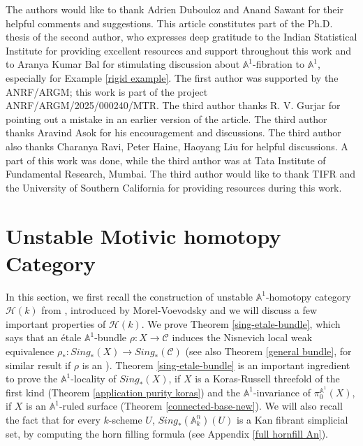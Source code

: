 \documentclass[11pt, reqno]{amsart}
\theoremstyle{plain}
\theoremstyle{definition}
\newcommand{\A}{{\mathbb A}}
\begin{document}
The authors would like to thank Adrien Dubouloz and Anand Sawant for their helpful comments and suggestions. This article constitutes part of the Ph.D. thesis of the second author, who expresses deep gratitude to the Indian Statistical Institute for providing excellent resources and support throughout this work and to Aranya Kumar Bal for stimulating discussion about $\A^1$-fibration to $\A^1$, especially for Example \ref{rigid example}. The first author was supported by the ANRF/ARGM; this work is part of the project ANRF/ARGM/2025/000240/MTR. The third author thanks R. V. Gurjar for pointing out a mistake in an earlier version of the article. The third author thanks Aravind Asok for his encouragement and discussions. The third author also thanks Charanya Ravi, Peter Haine, Haoyang Liu for helpful discussions. A part of this work was done, while the third author was at Tata Institute of Fundamental Research, Mumbai. The third author would like to thank TIFR and the University of Southern California for providing resources during this work.




	\section{Unstable Motivic homotopy Category}
In this section, we first recall the construction of unstable $\mathbb{A}^1$-homotopy category $\mathcal{H}(k)$ from \cite{mv}, introduced by Morel-Voevodsky and we will discuss a few important properties of $\mathcal{H}(k)$. 
We prove Theorem \ref{sing-etale-bundle}, which says that an \'etale $\A^1$-bundle $\rho: X \to \mathcal{C}$ induces the Nisnevich local weak equivalence $\rho_*: Sing_*(X) \to Sing_*(\mathcal{C})$ (see also Theorem \ref{general bundle}, for similar result if $\rho$ is an ). Theorem \ref{sing-etale-bundle} is an important ingredient to prove the $\A^1$-locality of $Sing_*(X)$, if $X$ is a Koras-Russell threefold of the first kind (Theorem \ref{application purity koras}) and the $\A^1$-invariance of $\pi_0^{\A^1}(X)$, if $X$ is an $\A^1$-ruled surface (Theorem \ref{connected-base-new}).
We will also recall the fact that for every $k$-scheme $U$, $Sing_*(\mathbb{A}^n_k)(U)$ is a Kan fibrant simplicial set, by computing the horn filling formula (see Appendix \ref{full hornfill An}). \par
\end{document}
